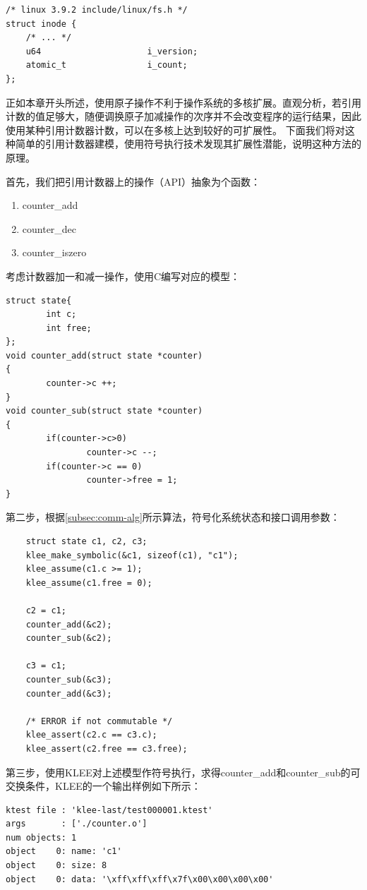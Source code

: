 \begin{Code}
	\centering
\begin{lstlisting}
/* linux 3.9.2 include/linux/fs.h */
struct inode {
	/* ... */
	u64                     i_version;
	atomic_t                i_count;
};
\end{lstlisting}
\end{Code}

正如本章开头所述，使用原子操作不利于操作系统的多核扩展。直观分析，若引用计数的值足够大，随便调换原子加减操作的次序并不会改变程序的运行结果，因此使用某种引用计数器计数，可以在多核上达到较好的可扩展性。
下面我们将对这种简单的引用计数器建模，使用符号执行技术发现其扩展性潜能，说明这种方法的原理。

首先，我们把引用计数器上的操作（API）抽象为个函数：
\begin{enumerate}
\item counter\_add
\item counter\_dec
\item counter\_iszero
\end{enumerate}

考虑计数器加一和减一操作，使用C编写对应的模型：

\begin{lstlisting}
struct state{    
        int c;   
        int free;
}; 
void counter_add(struct state *counter)
{
        counter->c ++;
}
void counter_sub(struct state *counter)
{
        if(counter->c>0)
                counter->c --;
        if(counter->c == 0)
                counter->free = 1;
}
\end{lstlisting}

第二步，根据\ref{subsec:comm-alg}所示算法，符号化系统状态和接口调用参数：
\begin{lstlisting}
	struct state c1, c2, c3;
	klee_make_symbolic(&c1, sizeof(c1), "c1");
	klee_assume(c1.c >= 1);
	klee_assume(c1.free = 0);

	c2 = c1;
	counter_add(&c2);
	counter_sub(&c2);

	c3 = c1;
	counter_sub(&c3);
	counter_add(&c3);

	/* ERROR if not commutable */
	klee_assert(c2.c == c3.c);
	klee_assert(c2.free == c3.free);
\end{lstlisting}

第三步，使用KLEE对上述模型作符号执行，求得counter\_add和counter\_sub的可交换条件，KLEE的一个输出样例如下所示：
\begin{lstlisting}
ktest file : 'klee-last/test000001.ktest'
args       : ['./counter.o']
num objects: 1
object    0: name: 'c1'
object    0: size: 8
object    0: data: '\xff\xff\xff\x7f\x00\x00\x00\x00'
\end{lstlisting}

